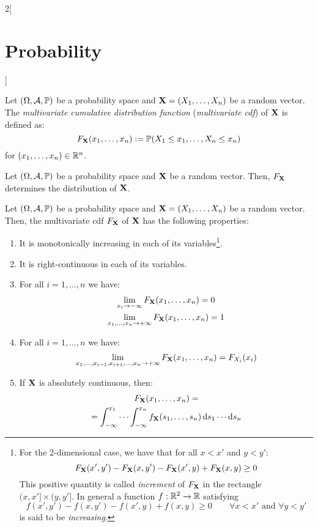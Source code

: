 \documentclass[../../../main_math.tex]{subfiles}
\begin{document}
\begin{multicols}{2}[\section{Probability}]
\begin{definition}
  \end{definition}
  \begin{definition}
    Let $(\Omega,\mathcal{A},\mathbb{P})$ be a probability space and $\boldsymbol{\mathrm{X}}=(X_1,\ldots,X_n)$ be a random vector. The \emph{multivariate cumulative distribution function} (\emph{multivariate cdf}) of $\boldsymbol{\mathrm{X}}$ is defined as: $$F_{\boldsymbol{\mathrm{X}}}(x_1,\ldots,x_n):=\mathbb{P}(X_1\leq x_1,\ldots,X_n\leq x_n)$$ for $(x_1,\ldots,x_n)\in\mathbb{R}^n$.
  \end{definition}
  \begin{theorem}
    Let $(\Omega,\mathcal{A},\mathbb{P})$ be a probability space and $\boldsymbol{\mathrm{X}}$ be a random vector. Then, $F_{\boldsymbol{\mathrm{X}}}$ determines the distribution of $\boldsymbol{\mathrm{X}}$.
  \end{theorem}
  \begin{proposition}
    Let $(\Omega,\mathcal{A},\mathbb{P})$ be a probability space and $\boldsymbol{\mathrm{X}}=(X_1,\ldots,X_n)$ be a random vector. Then, the multivariate cdf $F_{\boldsymbol{\mathrm{X}}}$ of $\boldsymbol{\mathrm{X}}$ has the following properties:
    \begin{enumerate}
      \item It is monotonically increasing in each of its variables\footnote{For the 2-dimensional case, we have that for all $x<x'$ and $y<y'$: $$F_{\boldsymbol{\mathrm{X}}}(x',y')-F_{\boldsymbol{\mathrm{X}}}(x,y')-F_{\boldsymbol{\mathrm{X}}}(x',y)+F_{\boldsymbol{\mathrm{X}}}(x,y)\geq 0$$ This positive quantity is called \emph{increment} of $F_{\boldsymbol{\mathrm{X}}}$ in the rectangle $(x,x']\times(y,y']$. In general a function $f:\mathbb{R}^2\rightarrow\mathbb{R}$ satisfying $$f(x',y')-f(x,y')-f(x',y)+f(x,y)\geq 0\qquad\forall x<x'\text{ and }\forall y<y'$$ is said to be \emph{increasing}.}.
      \item It is right-continuous in each of its variables.
      \item For all $i=1,\ldots,n$ we have:
            \begin{gather*}
              \lim_{x_i\to-\infty}F_{\boldsymbol{\mathrm{X}}}(x_1,\ldots,x_n)=0\\
              \lim_{x_1,\ldots,x_n\to+\infty}F_{\boldsymbol{\mathrm{X}}}(x_1,\ldots,x_n)=1
            \end{gather*}
      \item For all $i=1,\ldots,n$ we have: $$\lim_{x_1,\ldots,x_{i-1},x_{i+1},\ldots,x_n\to+\infty}F_{\boldsymbol{\mathrm{X}}}(x_1,\ldots,x_n)=F_{X_i}(x_i)$$
      \item If $\boldsymbol{\mathrm{X}}$ is absolutely continuous, then:
            \begin{multline*}
              F_{\vf{X}}(x_1,\ldots,x_n)=\\=\int_{-\infty}^{x_1}\cdots\int_{-\infty}^{x_n} f_{\vf{X}}(s_1,\ldots,s_n)\dd{s}_1\cdots\dd{s}_n

\end{multline*}
\end{enumerate}
\end{proposition}
\end{multicols}
\end{document}
